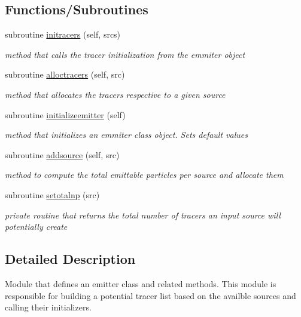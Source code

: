 \subsection*{Functions/\+Subroutines}
\begin{DoxyCompactItemize}
\item 
subroutine \mbox{\hyperlink{namespaceemitter__mod_ad89dfc083eae7362441c353225a74ebc}{initracers}} (self, srcs)
\begin{DoxyCompactList}\small\item\em method that calls the tracer initialization from the emmiter object \end{DoxyCompactList}\item 
subroutine \mbox{\hyperlink{namespaceemitter__mod_a7c677125988390e4c57909e4ea82d902}{alloctracers}} (self, src)
\begin{DoxyCompactList}\small\item\em method that allocates the tracers respective to a given source \end{DoxyCompactList}\item 
subroutine \mbox{\hyperlink{namespaceemitter__mod_a6376ad0f8e1739b29caf672aa0750373}{initializeemitter}} (self)
\begin{DoxyCompactList}\small\item\em method that initializes an emmiter class object. Sets default values \end{DoxyCompactList}\item 
subroutine \mbox{\hyperlink{namespaceemitter__mod_ab704fb0e2eb9b3b4b9542706b6fb4eaf}{addsource}} (self, src)
\begin{DoxyCompactList}\small\item\em method to compute the total emittable particles per source and allocate them \end{DoxyCompactList}\item 
subroutine \mbox{\hyperlink{namespaceemitter__mod_a5c219dd6692a761ad4bf968ae750fcc6}{setotalnp}} (src)
\begin{DoxyCompactList}\small\item\em private routine that returns the total number of tracers an input source will potentially create \end{DoxyCompactList}\end{DoxyCompactItemize}


\subsection{Detailed Description}
Module that defines an emitter class and related methods. This module is responsible for building a potential tracer list based on the availble sources and calling their initializers. 

